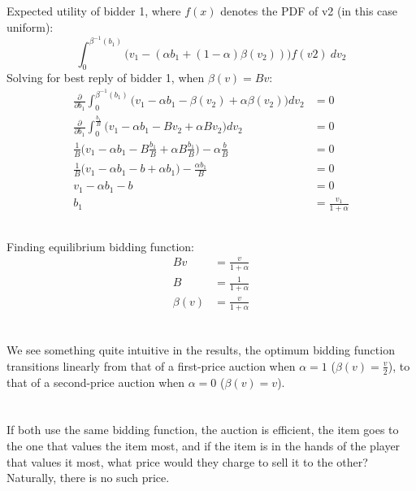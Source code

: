 \documentclass[a4paper,12pt]{article}
\begin{document}
\subsection{}
Expected utility of bidder 1, where $f(x)$ denotes the PDF of v2 (in this case uniform):
%
$$
\int_{0}^{\beta^{-1}(b_1)} \bigg( v_1 - (\alpha b_1 + (1 - \alpha)\beta(v_2))  \bigg) f(v2) \ dv_2
$$
%
Solving for best reply of bidder 1, when $\beta(v) = Bv$: 
\begin{align*}
\frac{\partial}{\partial b_1} \int_{0}^{\beta^{-1}(b_1)} \bigg( v_1 - \alpha b_1  - \beta(v_2) + \alpha\beta(v_2)  \bigg) dv_2 &= 0\\
\frac{\partial}{\partial b_1} \int_{0}^{\frac{b_1}{B}} \bigg( v_1 - \alpha b_1  - Bv_2 + \alpha Bv_2 \bigg) dv_2 &= 0 \\
\frac{1}{B} \bigg(v_1 - \alpha b_1  - B\frac{b_1}{B} + \alpha B\frac{b_1}{B} \bigg) - \alpha \frac{b}{B} &= 0 \\
\frac{1}{B} \bigg( v_1 - \alpha b_1  - b + \alpha b_1 \bigg) - \frac{\alpha b_1}{B} &= 0 \\
v_1 - \alpha b_1  - b &= 0 \\
b_1 &= \frac{v_1}{1 + \alpha}
\end{align*}
%
\subsection{}
%
Finding equilibrium bidding function: 
%
\begin{align*}
Bv &= \frac{v}{1 + \alpha} \\
B &= \frac{1}{1 + \alpha} \\
\beta(v) &= \frac{v}{1 + \alpha} \\
\end{align*}

\subsection{}
%
We see something quite intuitive in the results, the optimum bidding function transitions linearly from that of a first-price auction when $\alpha = 1$ ($\beta(v) = \frac{v}{2}$), to that of a second-price auction when $\alpha = 0$ ($\beta(v) = v$).

\section{}
\subsection{}
If both use the same bidding function, the auction is efficient, the item goes to the one that values the item most, and if the item is in the hands of the player that values it most, what price would they charge to sell it to the other? Naturally, there is no such price.
\end{document}
